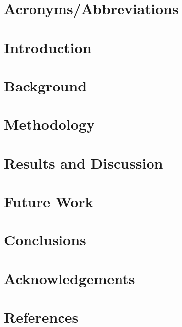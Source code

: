 \documentclass[10pt, letterpaper, twocolumn]{article}
\begin{document}

\acresetall

\setlength\nomlabelwidth{1cm}
{\raggedright\printnomenclature}

\section*{Acronyms/Abbreviations}
\printacronyms[name={Acronyms/Abbreviations}, heading=none]

\section{Introduction}\label{s:introduction}
\lipsum[1-3]

\section{Background}\label{s:background}
\lipsum[1-3]

\section{Methodology}\label{s:Methodology}
\lipsum[1-3]

\section{Results and Discussion}\label{s:results}
\lipsum[1-3]

\section{Future Work}\label{s:future_work}
\lipsum[1-3]

\section{Conclusions}\label{s:conclusions}
\lipsum[1-3]

\newpage
\section*{Acknowledgements}

\section*{References}
\printbibliography[heading=none]
\end{document}
